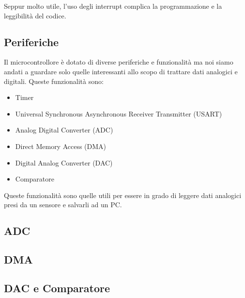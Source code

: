 Seppur molto utile, l'uso degli interrupt complica la programmazione e la leggibilità del codice.


\subsection{Periferiche}

Il microcontrollore è dotato di diverse periferiche e funzionalità ma noi siamo andati a guardare solo quelle interessanti allo scopo di trattare dati analogici e digitali. Queste funzionalità sono:
\begin{itemize}
    \item Timer
    \item Universal Synchronous Asynchronous Receiver Transmitter (USART)
    \item Analog Digital Converter (ADC)
    \item Direct Memory Access (DMA)
    \item Digital Analog Converter (DAC)
    \item Comparatore
\end{itemize}
Queste funzionalità sono quelle utili per essere in grado di leggere dati analogici presi da un sensore e salvarli ad un PC.





\subsection{ADC}

\subsection{DMA}

\subsection{DAC e Comparatore}